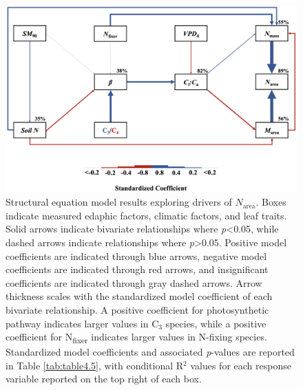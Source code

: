 \newpage
    \begin{figure}
        \centering
        \includegraphics[scale = 0.225]{ch4_TXeco/figs/TXeco_fig5_SEM.png}
        \caption[Structural equation model results exploring drivers of $N_\mathrm{area}$]{Structural equation model results exploring drivers of $N_\mathrm{area}$. Boxes indicate measured edaphic factors, climatic factors, and leaf traits. Solid arrows indicate bivariate relationships where \textit{p}<0.05, while dashed arrows indicate relationships where \textit{p}>0.05. Positive model coefficients are indicated through blue arrows, negative model coefficients are indicated through red arrows, and insignificant coefficients are indicated through gray dashed arrows. Arrow thickness scales with the standardized model coefficient of each bivariate relationship. A positive coefficient for photosynthetic pathway indicates larger values in C$_3$ species, while a positive coefficient for N\textsubscript{fixer} indicates larger values in N-fixing species. Standardized model coefficients and associated \textit{p}-values are reported in Table \ref{tab:table4.5}, with conditional R$^2$ values for each response variable reported on the top right of each box.}
        \label{fig:figure4.5}
    \end{figure}
\clearpage

